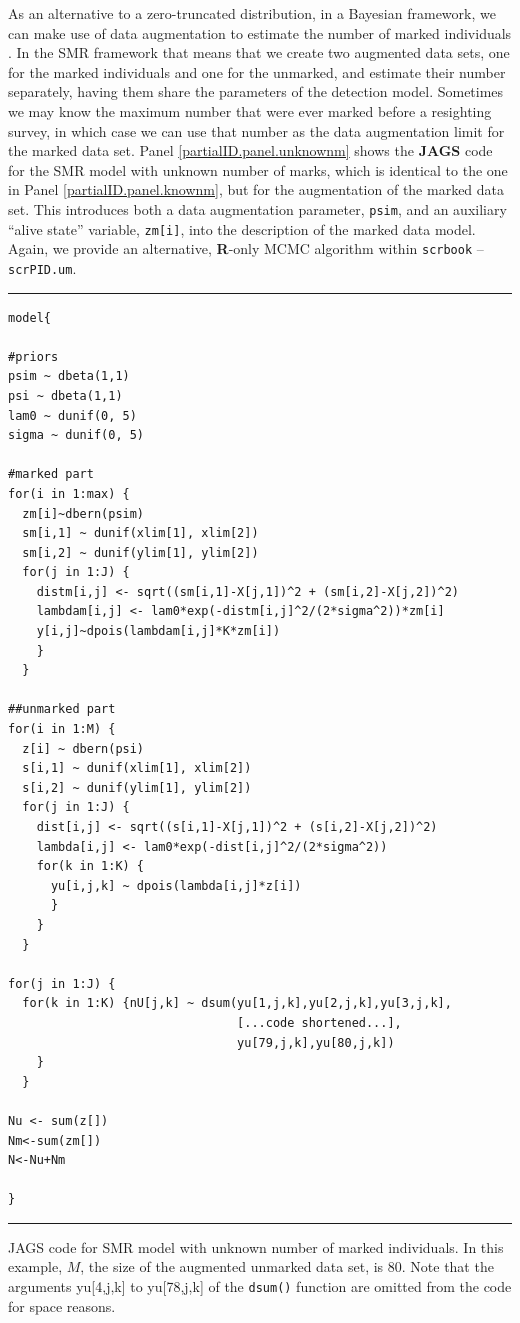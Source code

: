 As an alternative to a zero-truncated distribution, in a Bayesian
framework, we can make use of data augmentation to estimate the number
of marked individuals \citep{mcclintock_hoeting:2010}. In the SMR framework that means that we create two augmented data sets, one for the marked individuals and one for the unmarked, and estimate their number separately, having them share the parameters of the detection model. Sometimes we may know the maximum number that were ever marked before a resighting survey, in which case we can use that number as the data augmentation limit for the marked data set. Panel \ref{partialID.panel.unknownm} shows the {\bf JAGS} code for the SMR model with unknown number of marks, which is identical to the one in Panel \ref{partialID.panel.knownm}, but for the augmentation of the marked data set. This introduces both a data augmentation parameter, {\tt psim}, and an auxiliary ``alive state'' variable, {\tt zm[i]}, into the description of the marked data model. Again, we provide an alternative, {\bf R}-only MCMC algorithm within {\tt scrbook} -- {\tt scrPID.um}.

\begin{panel}[htp]
\centering
\rule[0.15in]{\textwidth}{.03in}
{\small
\begin{verbatim}
model{

#priors
psim ~ dbeta(1,1)
psi ~ dbeta(1,1)
lam0 ~ dunif(0, 5)
sigma ~ dunif(0, 5)

#marked part
for(i in 1:max) {
  zm[i]~dbern(psim)
  sm[i,1] ~ dunif(xlim[1], xlim[2])
  sm[i,2] ~ dunif(ylim[1], ylim[2])
  for(j in 1:J) {
    distm[i,j] <- sqrt((sm[i,1]-X[j,1])^2 + (sm[i,2]-X[j,2])^2)
    lambdam[i,j] <- lam0*exp(-distm[i,j]^2/(2*sigma^2))*zm[i]
    y[i,j]~dpois(lambdam[i,j]*K*zm[i])
    }
  }

##unmarked part
for(i in 1:M) {
  z[i] ~ dbern(psi)
  s[i,1] ~ dunif(xlim[1], xlim[2])
  s[i,2] ~ dunif(ylim[1], ylim[2])
  for(j in 1:J) {
    dist[i,j] <- sqrt((s[i,1]-X[j,1])^2 + (s[i,2]-X[j,2])^2)
    lambda[i,j] <- lam0*exp(-dist[i,j]^2/(2*sigma^2))
    for(k in 1:K) {
      yu[i,j,k] ~ dpois(lambda[i,j]*z[i])
      }
    }
  }

for(j in 1:J) {
  for(k in 1:K) {nU[j,k] ~ dsum(yu[1,j,k],yu[2,j,k],yu[3,j,k],
								[...code shortened...],
								yu[79,j,k],yu[80,j,k])
	}
  }

Nu <- sum(z[])
Nm<-sum(zm[])
N<-Nu+Nm

}
\end{verbatim}
}
\rule[-0.15in]{\textwidth}{.03in}
\caption{
JAGS code for SMR model with unknown number of marked individuals. In this example, $M$, the size of the augmented unmarked data set, is 80. Note that the arguments yu[4,j,k] to yu[78,j,k] of the {\tt dsum()} function are omitted from the code for space reasons.
}
\label{partialID.panel.unknownm}
\end{panel}

